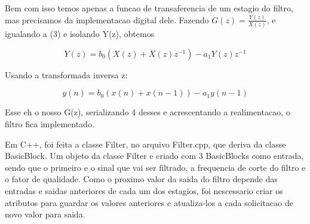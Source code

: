 \documentclass{article}
\begin{document}
Bem com isso temos apenas a funcao de transaferencia de um estagio do filtro, mas precisamos da implementacao digital dele.
Fazendo $G(z) = \frac{Y(z)}{X(z)}$, e igualando a (3) e isolando Y(z), obtemos


\begin{equation}\label{eq:(5)}
Y(z) = b_0(X(z)+X(z)z^{-1})-a_1Y(z)z^{-1}
\end{equation}

Usando a transformada inversa z:

\begin{equation}\label{eq:(6)}
y(n)=b_0(x(n)+x(n-1))-a_1 y(n-1)  
\end{equation}


Esse eh o nosso G(z), serializando 4 desses e acrescentando a realimentacao, o filtro fica implementado.

Em C++, foi feita a classe Filter, no arquivo Filter.cpp, que deriva da classe BasicBlock. Um objeto da classe Filter e criado com 3 BasicBlocks como entrada, sendo que o primeiro e o sinal que vai ser filtrado, a frequencia de corte do filtro e o fator de qualidade. Como o proximo valor da saida do filtro depende das entradas e saidas anteriores de cada um dos estagios, foi nescessario criar os atributos para guardar os valores anteriores e atualiza-los a cada solicitacao de novo valor para saida.




\end{document}
